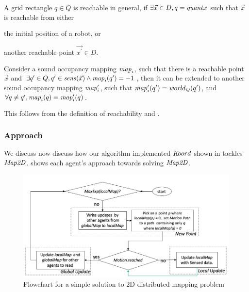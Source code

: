A grid rectangle $q\in Q$ is reachable in general, if $\exists \Vec{x}\in D, q = \mathit{quant}{x}$ such that $\Vec{x}$ is reachable from either \begin{inparaenum} [(a)]\item the initial position of a robot, or \item another reachable point $\Vec{x^\prime}\in D$.
\end{inparaenum}

\begin{lemma}
    Consider a sound occupancy mapping $\mathit{map}_i$, such that there is a reachable point $\Vec{x}$ and $\exists q^\prime \in Q, q^\prime\in\mathit{sens}(\Vec{x}) \wedge \mathit{map}_i(q^\prime) = -1$, then it can be extended to another sound occupancy mapping $\mathit{map}_i^\prime$, such that $\mathit{map}_i^\prime(q^\prime) = \mathit{world}_Q(q^\prime)$, and $\forall q \neq q^\prime,\mathit{map}_i(q) = \mathit{map}_i^\prime(q)$.
\end{lemma}

This follows from the definition of reachability and .



\subsubsection{Approach}
We discuss now discuss how our algorithm implemented $K\kern-2pt oord$ shown in  tackles $\mathit{Map2D}$.  shows each agent's approach towards solving $\mathit{Map2D}$.

\begin{figure}[!htbp]
    \centering
    \includegraphics[width=\linewidth]{figs/map_flowchart.png}
    \caption{Flowchart for a simple solution to 2D distributed mapping problem\vspace{-2mm}}
    \label{fig:flowmap}
\end{figure}

